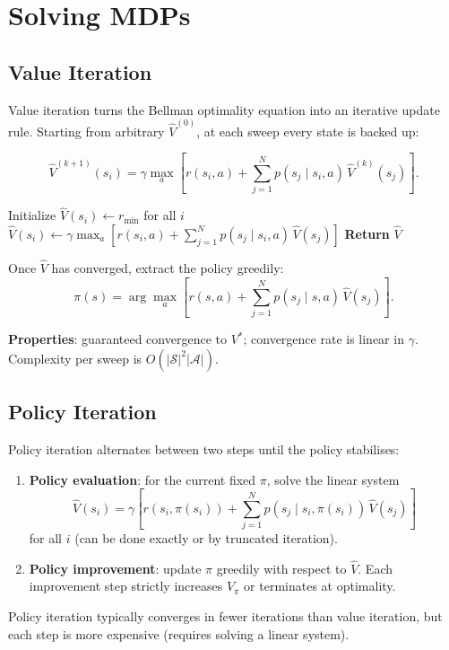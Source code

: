\documentclass[11pt,a4paper]{article}
\theoremstyle{definition}
\theoremstyle{plain}
\theoremstyle{remark}
\begin{document}
\section{Solving MDPs}

\subsection{Value Iteration}

Value iteration turns the Bellman optimality equation into an iterative update rule. Starting from arbitrary $\hat{V}^{(0)}$, at each sweep every state is backed up:

\begin{tcolorbox}[colback=blue!5!white,colframe=blue!75!black,title=\textbf{Bellman Backup (Discrete)}]
\[
    \hat{V}^{(k+1)}(s_i) = \gamma\max_a \!\left[r(s_i, a) + \sum_{j=1}^{N} p(s_j \mid s_i, a)\, \hat{V}^{(k)}(s_j)\right].
\]
\end{tcolorbox}

\begin{algorithm}
\caption{Discrete Value Iteration}
\begin{algorithmic}
\STATE Initialize $\hat{V}(s_i) \leftarrow r_{\min}$ for all $i$
        \STATE $\hat{V}(s_i) \leftarrow \gamma\max_a \left[r(s_i, a) + \sum_{j=1}^{N} p(s_j \mid s_i, a)\,\hat{V}(s_j)\right]$
    \ENDFOR
\ENDWHILE
\STATE \textbf{Return} $\hat{V}$
\end{algorithmic}
\end{algorithm}

Once $\hat{V}$ has converged, extract the policy greedily:
\[
    \pi(s) = \arg\max_a \!\left[r(s, a) + \sum_{j=1}^{N} p(s_j \mid s, a)\,\hat{V}(s_j)\right].
\]

\textbf{Properties}: guaranteed convergence to $V^*$; convergence rate is linear in $\gamma$. Complexity per sweep is $O(|\mathcal{S}|^2 |\mathcal{A}|)$.

\subsection{Policy Iteration}

Policy iteration alternates between two steps until the policy stabilises:
\begin{enumerate}
    \item \textbf{Policy evaluation}: for the current fixed $\pi$, solve the linear system
    \[
        \hat{V}(s_i) = \gamma\!\left[r(s_i, \pi(s_i)) + \sum_{j=1}^{N} p(s_j \mid s_i, \pi(s_i))\,\hat{V}(s_j)\right]
    \]
    for all $i$ (can be done exactly or by truncated iteration).
    \item \textbf{Policy improvement}: update $\pi$ greedily with respect to $\hat{V}$. Each improvement step strictly increases $V_\pi$ or terminates at optimality.
\end{enumerate}
Policy iteration typically converges in fewer iterations than value iteration, but each step is more expensive (requires solving a linear system).
\end{document}
